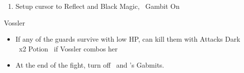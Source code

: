\begin{enumerate}
	\item Setup cursor to Reflect and Black Magic, \penelo\ Gambit On
\end{enumerate}
\begin{battle}{Vossler}
	\begin{itemize}
		\ashef Aero Imperial Swordsman C (the middle one)
		\vaanf Reflect \vaan
		\penelof Reflect Ashe
		\ashef Gambit On
		\item If any of the guards survive with low HP, can kill them with Attacks
		      \vaanf Dark \vaan\ x2
		      \vaan Potion \ashe\ if Vossler combos her
		\item At the end of the fight, turn off \ashe\ and \penelo's Gabmits.
	\end{itemize}
\end{battle}